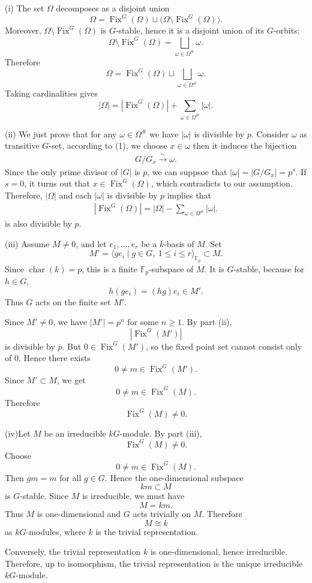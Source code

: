 \begin{solution}
    (i) The set \(\Omega\) decomposes as a disjoint union
\[
\Omega=\operatorname{Fix}^G(\Omega)\sqcup
\bigl(\Omega\setminus \operatorname{Fix}^G(\Omega)\bigr).
\]
Moreover, \(\Omega\setminus \operatorname{Fix}^G(\Omega)\) is \(G\)-stable, hence it is a disjoint union of its \(G\)-orbits:
\[
\Omega\setminus \operatorname{Fix}^G(\Omega)
=
\bigsqcup_{\omega\in \Omega^\#}\omega .
\]
Therefore
\[
\Omega
=
\operatorname{Fix}^G(\Omega)
\sqcup
\bigsqcup_{\omega\in \Omega^\#}\omega .
\]
Taking cardinalities gives
\[
|\Omega|
=
|\operatorname{Fix}^G(\Omega)|
+
\sum_{\omega\in \Omega^\#}|\omega|.
\]

(ii) We just prove that for any $\omega\in \Omega^\#$ we have $|\omega|$ is divisible by $p$. Consider $\omega$ as transitive $G$-set, according to (1), we choose $x\in \omega$ then it induces the bijection
\begin{align*}
    G/G_x \xrightarrow{\sim} \omega.
\end{align*}
Since the only prime divisor of $|G|$ is $p$, we can suppsoe that $|\omega|= |G/G_x|=p^s.$ If $s=0$, it turns out that $x\in \operatorname{Fix}^G(\Omega)$, which contradicts to our assumption.
Therefore, $|\Omega|$ and each $|\omega|$ is divisible by $p$ implies that 
\begin{align*}
|\operatorname{Fix}^G(\Omega)| =  |\Omega| - \sum_{\omega\in \Omega^\#}|\omega|.
\end{align*}
is also divisible by $p$.

(iii) Assume \(M\neq 0\), and let \(e_1,\dots,e_r\) be a \(k\)-basis of \(M\).
Set
\[
M'=\langle ge_i\mid g\in G,\ 1\leq i\leq r\rangle_{\mathbb F_p}\subset M.
\]
Since \(\operatorname{char}(k)=p\), this is a finite \(\mathbb F_p\)-subspace of
\(M\). It is \(G\)-stable, because for \(h\in G\),
\[
h(ge_i)=(hg)e_i\in M'.
\]
Thus \(G\) acts on the finite set \(M'\).

Since \(M'\neq 0\), we have \(|M'|=p^n\) for some \(n\geq 1\). By part (ii),
\[
|\operatorname{Fix}^G(M')|
\]
is divisible by \(p\). But \(0\in \operatorname{Fix}^G(M')\), so the fixed
point set cannot consist only of \(0\). Hence there exists
\[
0\neq m\in \operatorname{Fix}^G(M').
\]
Since \(M'\subset M\), we get
\[
0\neq m\in \operatorname{Fix}^G(M).
\]
Therefore
\[
\operatorname{Fix}^G(M)\neq 0.
\]

(iv)Let \(M\) be an irreducible \(kG\)-module. By part (iii),
\[
\operatorname{Fix}^G(M)\neq 0.
\]
Choose
\[
0\neq m\in \operatorname{Fix}^G(M).
\]
Then \(gm=m\) for all \(g\in G\). Hence the one-dimensional subspace
\[
km\subset M
\]
is \(G\)-stable. Since \(M\) is irreducible, we must have
\[
M=km.
\]
Thus \(M\) is one-dimensional and \(G\) acts trivially on \(M\). Therefore
\[
M\cong k
\]
as \(kG\)-modules, where \(k\) is the trivial representation.

Conversely, the trivial representation \(k\) is one-dimensional, hence
irreducible. Therefore, up to isomorphism, the trivial representation is the
unique irreducible \(kG\)-module.
\end{solution}


